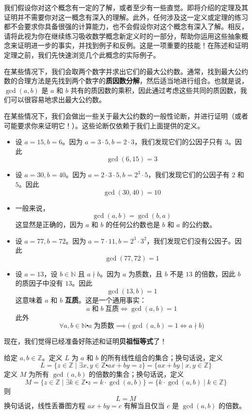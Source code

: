 我们假设你对这个概念有一定的了解，或者至少有一些直觉。即将介绍的定理及其证明并不需要你对这一概念有深入的理解。此外，任何涉及这一定义或定理的练习都不会要求你具备很强的计算能力，也不会假设你对这个概念有深入了解。相反，请将此视为你在继续练习吸收数学概念新定义时的一部分，帮助你运用这些抽象概念来证明进一步的事实，并找到例子和反例。这是一项重要的技能！在陈述和证明定理之前，我们先快速浏览几个此概念的实际例子。\\

\begin{example}
    在某些情况下，我们会取两个数字并求出它们的最大公约数。通常，找到最大公约数的合理方法是先找到两个数字的\textbf{质因数分解}，然后适当地进行组合。也就是说，$\gcd(a, b)$ 是 $a$ 和 $b$ 共有的质因数的乘积，因此通过考虑这些共同的质因数，我们可以很容易地求出最大公约数。

    在某些情况下，我们会做出一些关于最大公约数的一般性论断，并进行证明（或者可能要求你来证明它！）。这些论断仅依赖于我们上面提供的定义。

    \begin{itemize}
        \item 设 $a=15, b=6$。因为 $a = 3 \cdot 5, b = 2 \cdot 3$，我们发现它们的公因子只有 $3$。因此
            \[\gcd(6, 15) = 3\]
        \item 设 $a=30, b=40$。因为 $a = 2 \cdot 3 \cdot 5, b = 2^3 \cdot 5$，我们发现它们的公因子有 $2$ 和 $5$。因此
            \[\gcd(30, 40) = 10\]
        \item 一般来说，
            \[\gcd(a, b) = \gcd(b, a)\]
            这显然是正确的，因为 $a$ 和 $b$ 的任何公约数也是 $b$ 和 $a$ 的公约数。
        \item 设 $a=77, b=72$。因为 $a = 7 \cdot 11, b = 2^3 \cdot 3^2$，我们发现它们没有公因子。因此
            \[\gcd(77, 72) = 1\]
        \item 设 $a=13$，设 $b \in \mathbb{N}$ 且 $a \nmid b$。因为 $a$ 为质数，且 $b$ 不是 $13$ 的倍数，因此 $b$ 的质因子中没有 $13$。因此
            \[\gcd(13, b) = 1\]
            这意味着 $a$ 和 $b$ \textbf{互质}。这是一个通用事实：
            \[a \;\text{和}\; b \;\text{互质} \iff \gcd(a, b) = 1\]
            此外
            \[\forall a, b \in \mathbb{N} \centerdot a \;\text{为质数} \implies \big(\gcd(a,b)=1 \iff a \nmid b\big)\]
    \end{itemize}
\end{example}

现在，我们觉得已经准备好陈述和证明\textbf{贝祖恒等式}了！

\begin{theorem}[贝祖恒等式]\label{theorem6.5.31}
   给定 $a, b \in \mathbb{Z}$。定义 $L$ 为 $a$ 和 $b$ 的所有线性组合的集合；换句话说，定义
   \[L = \{z \in \mathbb{Z} \mid \exists x, y \in \mathbb{Z} \centerdot ax + by = z\} = \{ax + by \mid x, y \in \mathbb{Z}\}\]
   定义 $M$ 为所有 $\gcd(a, b)$ 的倍数的集合；换句话说，定义
   \[M = \{z \in \mathbb{Z} \mid \exists k \in \mathbb{Z} \centerdot z = k \cdot \gcd(a, b)\} = \{k \cdot \gcd(a, b) \mid k \in \mathbb{Z}\}\]
   则
   \[L = M\]
   换句话说，线性丢番图方程 $ax + by = c$ 有解当且仅当 $c$ 是 $\gcd(a, b)$ 的倍数。
\end{theorem}

